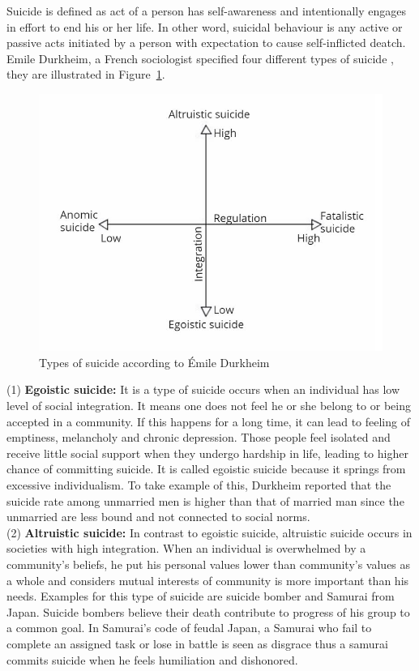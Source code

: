Suicide is defined as act of a person has self-awareness and intentionally engages in effort to end his or her life. In other word, suicidal behaviour is any active or passive acts initiated by a person with expectation to cause self-inflicted deatch. Emile Durkheim, a French sociologist specified four different types of suicide \cite{Durkheim1897}, they are illustrated in Figure~\ref{fig:types_of_suicide}.\\
\begin{figure}[!ht]
\centering
\includegraphics[width=\textwidth, clip=true]{img/type_suicide}
\caption[Types of suicide]{Types of suicide according to Émile Durkheim} 
\label{fig:types_of_suicide}
\end{figure}
(1) \textbf{Egoistic suicide:} It is a type of suicide occurs when an individual has low level of social integration. It means one does not feel he or she belong to or being accepted in a community. If this happens for a long time, it can lead to feeling of emptiness, melancholy and chronic depression. Those people feel isolated and receive little social support when they undergo hardship in life, leading to higher chance of committing suicide. It is called egoistic suicide because it springs from excessive individualism. To take example of this, Durkheim reported that the suicide rate among unmarried men is higher than that of married man since the unmarried are less bound and not connected to social norms.\\
(2) \textbf{Altruistic suicide:} In contrast to egoistic suicide, altruistic suicide occurs in societies with high integration. When an individual is overwhelmed by a community's beliefs, he put his personal values lower than community's values as a whole and considers mutual interests of community is more important than his needs. Examples for this type of suicide are suicide bomber and Samurai from Japan. Suicide bombers believe their death contribute to progress of his group to a common goal. In Samurai's code of feudal Japan, a Samurai who fail to complete an assigned task or lose in battle is seen as disgrace thus a samurai commits suicide when he feels humiliation and dishonored.\\
